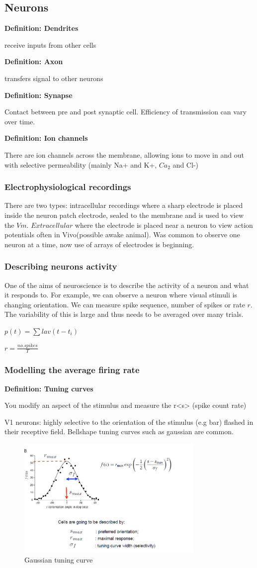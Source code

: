 \documentclass[11pt]{article}
\newcommand{\define}[2] {
  \textbf{Definition: #1}
  \begin{center} #2
\end{center}
}
\begin{document}
\subsection{Neurons}
\define{Dendrites}{receive inputs from other cells}
\define{Axon}{transfers signal to other neurons}
\define{Synapse}{Contact between pre and post synaptic cell. Efficiency of transmission can vary over time.}
\define{Ion channels}{There are ion channels across the membrane, allowing ions to move in and out with selective permeability (mainly Na+ and K+, $Ca_2$ and Cl-)}

\subsubsection{Electrophysiological recordings}
There are two types: intracellular recordings where a sharp electrode is placed inside the neuron patch electrode, sealed to the membrane and is used to view the $Vm$. $Extracellular$ where the electrode is placed near a neuron to view action potentials often in Vivo(possible awake animal). Was common to observe one neuron at a time, now use of arrays of electrodes is beginning. 

\subsubsection{Describing neurons activity}
One of the aims of neuroscience is to describe the activity of a neuron and what it responds to. For example, we can observe a neuron where visual stimuli is changing orientation. We can measure spike sequence, number of spikes or rate $r$. The variability of this is large and thus needs to be averaged over many trials.

$p(t) = \sum lav(t - t_{i})$

$r = \frac{no.spikes}{T}$

\subsubsection{Modelling the average firing rate}

\define{Tuning curves}{You modify an aspect of the stimulus and measure the r<s> (spike count rate)}

V1 neurons: highly selective to the orientation of the stimulus (e.g bar) flashed in their receptive field. Bellshape tuning curves such as gaussian are common.

\begin{figure}[H]
\centering
\includegraphics[width=90mm]{images/gaussian_tuning curve.png}
\caption{Gaussian tuning curve}
\label{old_house}
\end{figure}
\end{document}
